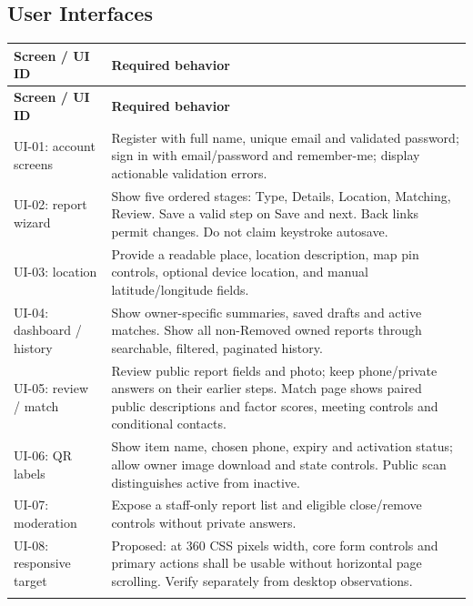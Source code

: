 \documentclass[12pt,a4paper,oneside]{report}
\begin{document}
\subsection{User Interfaces}

\begin{longtable}{@{}P{0.27\dimexpr\textwidth-12pt\relax}P{0.73\dimexpr\textwidth-12pt\relax}@{}}

\toprule \textbf{Screen / UI ID} & \textbf{Required behavior} \\ \midrule\endfirsthead

\toprule \textbf{Screen / UI ID} & \textbf{Required behavior} \\ \midrule\endhead

\bottomrule\endfoot

UI-01: account screens & Register with full name, unique email and validated password; sign in with email/password and remember-me; display actionable validation errors. \\ \addlinespace[3pt]

UI-02: report wizard & Show five ordered stages: Type, Details, Location, Matching, Review. Save a valid step on Save and next. Back links permit changes. Do not claim keystroke autosave. \\ \addlinespace[3pt]

UI-03: location & Provide a readable place, location description, map pin controls, optional device location, and manual latitude/longitude fields. \\ \addlinespace[3pt]

UI-04: dashboard / history & Show owner-specific summaries, saved drafts and active matches. Show all non-Removed owned reports through searchable, filtered, paginated history. \\ \addlinespace[3pt]

UI-05: review / match & Review public report fields and photo; keep phone/private answers on their earlier steps. Match page shows paired public descriptions and factor scores, meeting controls and conditional contacts. \\ \addlinespace[3pt]

UI-06: QR labels & Show item name, chosen phone, expiry and activation status; allow owner image download and state controls. Public scan distinguishes active from inactive. \\ \addlinespace[3pt]

UI-07: moderation & Expose a staff-only report list and eligible close/remove controls without private answers. \\ \addlinespace[3pt]

UI-08: responsive target & Proposed: at 360 CSS pixels width, core form controls and primary actions shall be usable without horizontal page scrolling. Verify separately from desktop observations. \\ \addlinespace[3pt]

\end{longtable}
\end{document}
